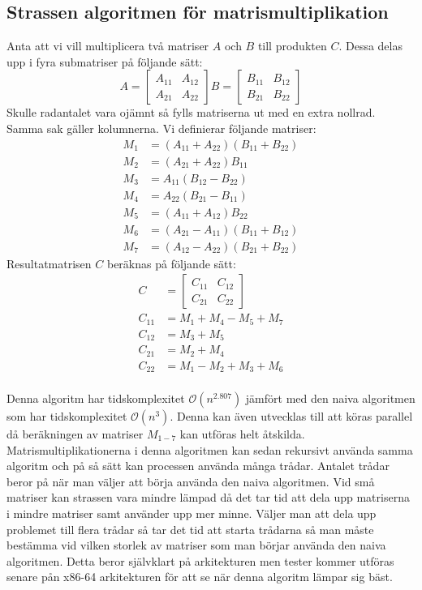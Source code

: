 \subsection{Strassen algoritmen för matrismultiplikation}
Anta att vi vill multiplicera två matriser $A$ och $B$ till produkten $C$. Dessa delas upp i fyra submatriser på följande sätt:
 $$A=\begin{bmatrix}
A_{11} & A_{12} \\
A_{21}& A_{22}
 \end{bmatrix}
 B=\begin{bmatrix}
B_{11} & B_{12} \\
B_{21}& B_{22}
 \end{bmatrix}
 $$
 Skulle radantalet vara ojämnt så fylls matriserna ut med en extra nollrad. Samma sak gäller kolumnerna.
 Vi definierar följande matriser:
  \begin{align}
  M_1 & =(A_{11}+A_{22})(B_{11}+B_{22}) \\
  M_2 & =(A_{21}+A_{22})B_{11} \\
  M_3 & =A_{11}(B_{12}-B_{22}) \\
  M_4 & =A_{22}(B_{21}-B_{11}) \\
  M_5 & =(A_{11}+A_{12})B_{22} \\
  M_6 & =(A_{21}-A_{11})(B_{11}+B_{12}) \\
  M_7 & =(A_{12}-A_{22})(B_{21}+B_{22}) 
 \end{align}
 Resultatmatrisen $C$ beräknas på följande sätt:
   \begin{align}
    C & =\begin{bmatrix}
C_{11} & C_{12} \\
C_{21}& C_{22}
 \end{bmatrix} \\
  C_{11} & =M_1+M_4-M_5+M_7 \\
  C_{12} & = M_3+M_5 \\
  C_{21} & = M_2+M_4 \\
  C_{22} & = M_1-M_2+M_3+M_6
 \end{align}
 \\
Denna algoritm har tidskomplexitet $\mathcal{O}(n^{2.807})$ jämfört med den naiva algoritmen som har tidskomplexitet $\mathcal{O}(n^{3})$. Denna kan även utvecklas till att köras parallel då beräkningen av matriser $M_{1-7}$ kan utföras helt åtskilda. Matrismultiplikationerna i denna algoritmen kan sedan rekursivt använda samma algoritm och på så sätt kan processen använda många trådar. Antalet trådar beror på när man väljer att börja använda den naiva algoritmen. Vid små matriser kan strassen vara mindre lämpad då det tar tid att dela upp matriserna i mindre matriser samt använder upp mer minne. Väljer man att dela upp problemet till flera trådar så tar det tid att starta trådarna så man måste bestämma vid vilken storlek av matriser som man börjar använda den naiva algoritmen. Detta beror självklart på arkitekturen men tester kommer utföras senare pån x86-64 arkitekturen för att se när denna algoritm lämpar sig bäst. 
